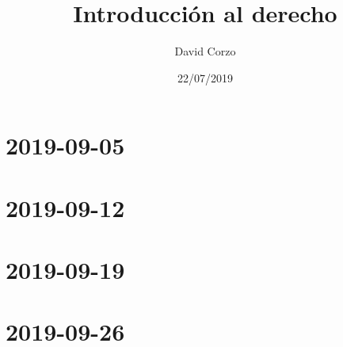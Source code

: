 \documentclass{book}
\author{David Corzo}
\date{22/07/2019}
\title{Introducción al derecho}
\begin{document}
\maketitle
\tableofcontents


\chapter{}


\chapter{}


\chapter{}


\chapter{}


\chapter{}


\chapter{}


\chapter{2019-09-05}


\chapter{2019-09-12}


\chapter{2019-09-19}


\chapter{2019-09-26}

\end{document}
